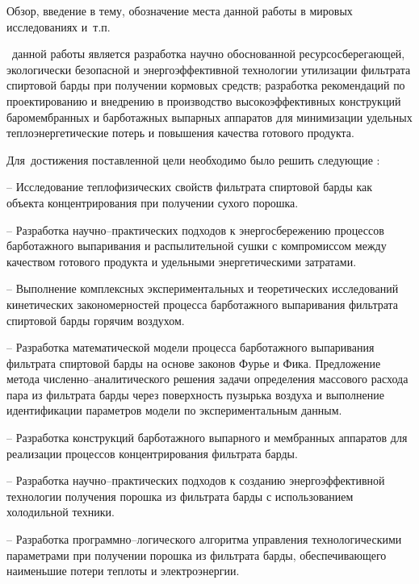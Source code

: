 {\actuality} Обзор, введение в тему, обозначение места данной работы в
мировых исследованиях и~т.\:п.

 \aim\ данной работы является разработка научно обоснованной ресурсосберегающей, экологически безопасной и энергоэффективной технологии утилизации фильтрата спиртовой барды при получении кормовых средств; разработка рекомендаций по проектированию и внедрению в производство высокоэффективных конструкций баромембранных и барботажных выпарных аппаратов для минимизации удельных теплоэнергетические потерь и повышения качества готового продукта.

Для~достижения поставленной цели необходимо было решить следующие {\tasks}:

-- Исследование теплофизических свойств фильтрата спиртовой барды как объекта концентрирования при получении сухого порошка.

-- Разработка научно--практических подходов к энергосбережению процессов барботажного выпаривания и распылительной сушки  с компромиссом между качеством готового продукта и удельными энергетическими затратами.

-- Выполнение комплексных экспериментальных и теоретических исследований кинетических закономерностей процесса барботажного выпаривания фильтрата спиртовой барды горячим воздухом.

--  Разработка математической модели процесса барботажного выпаривания фильтрата спиртовой барды на основе законов Фурье и Фика. Предложение метода численно--аналитического решения задачи определения массового расхода пара из фильтрата барды через поверхность пузырька воздуха и выполнение идентификации параметров модели по экспериментальным данным.

-- Разработка конструкций барботажного выпарного и мембранных аппаратов для реализации процессов концентрирования фильтрата барды.

-- Разработка научно--практических подходов к созданию энергоэффективной технологии получения порошка из фильтрата барды с использованием холодильной техники.

-- Разработка программно--логического алгоритма управления технологическими параметрами при получении порошка из фильтрата барды, обеспечивающего наименьшие потери теплоты и электроэнергии.

